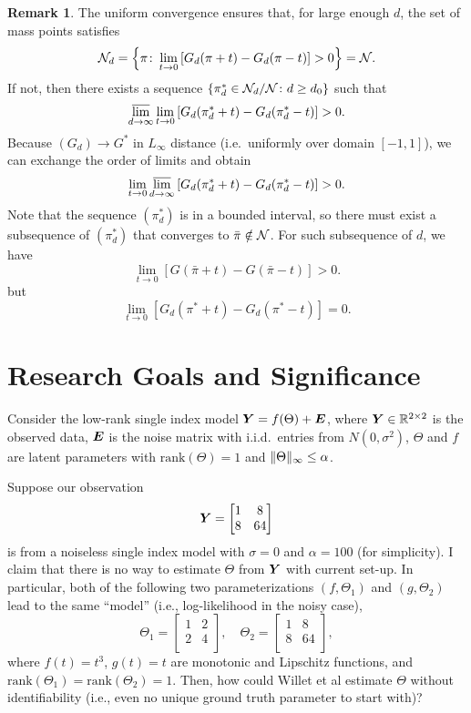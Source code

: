 \documentclass[10pt]{article}
\theoremstyle{definition}
\theoremstyle{definition}
\newtheorem{rmk}{Remark}
\theoremstyle{definition}
\begin{document}
\begin{enumerate}
\begin{rmk} The uniform convergence ensures that, for large enough $d$, the set of mass points satisfies
\[
\mathcal{N}_d=\left\{\pi\colon \lim_{t\to 0}\left[G_d(\pi+t)-G_d(\pi-t)\right] > 0\right\} = \mathcal{N}.
\]
If not, then there exists a sequence $\{\pi_d^*\in \mathcal{N}_d/\mathcal{N}\colon d\geq d_0\}$ such that
\[
 \varlimsup_{d\to\infty}\lim_{t\to 0}\left[G_d(\pi_d^*+t)-G_d(\pi_d^*-t)\right] > 0.
\] 
Because $(G_d)\to G^*$ in $L_\infty$ distance (i.e.\ uniformly over domain $[-1,1]$), we can exchange the order of limits and obtain
\[
\lim_{t\to 0} \varlimsup_{d\to\infty}\left[G_d(\pi_d^*+t)-G_d(\pi_d^*-t)\right] > 0.
\]
Note that the sequence $(\pi^*_d)$ is in a bounded interval, so there must exist a subsequence of $(\pi^*_d)$ that converges to $\bar \pi \notin \mathcal{N}$. For such subsequence of $d$, we have
\[
\lim_{t\to 0}\left[G(\bar \pi+t)-G(\bar \pi-t)\right] > 0.
\]
but
\[
\lim_{t\to 0} \left[G_d(\pi^*+t)-G_d(\pi^*-t)\right] =0.
\]
\end{rmk}
\section{Research Goals and Significance}
Consider the low-rank single index model $\bm Y=f(\Theta)+\bm{E}$, where $\bm Y\in\mathbb{R}^{2\times 2}$ is the observed data, $\bm{E}$ is the noise matrix with i.i.d.\ entries from $N(0,\sigma^2)$, $\Theta$ and $f$ are latent parameters with $\text{rank}(\Theta)=1$ and $\lVert\Theta\rVert_\infty\leq \alpha$.

Suppose our observation
\[
\bm Y=
\begin{bmatrix}
1 &8\\
8 &64\\
\end{bmatrix}
\]
is from a noiseless single index model with $\sigma=0$ and $\alpha=100$ (for simplicity). I claim that there is no way to estimate $\Theta$ from $\bm Y$ with current set-up. In particular, both of the following two parameterizations $(f,\Theta_1)$ and $(g,\Theta_2)$ lead to the same ``model'' (i.e., log-likelihood in the noisy case),
\[
\Theta_1=\begin{bmatrix}
1 &2\\
2 &4\\
\end{bmatrix},\quad 
\Theta_2=\begin{bmatrix}
1 &8\\
8 &64\\
\end{bmatrix},
\]
where $f(t)=t^3$, $g(t)=t$ are monotonic and Lipschitz functions, and $\text{rank}(\Theta_1)=\text{rank}(\Theta_2)=1$. Then, how could Willet et al estimate $\Theta$ without identifiability (i.e., even no unique ground truth parameter to start with)? 


\end{enumerate}
\end{document}
